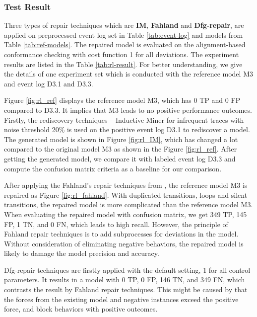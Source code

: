 \subsubsection{Test Result}
Three types of repair techniques which are \textbf{IM}, \textbf{Fahland} and \textbf{Dfg-repair}, are applied on preprocessed event log set in Table \ref{tab:event-log} and models from Table \ref{tab:ref-models}. The repaired model is evaluated on the alignment-based conformance checking with cost function 1 for all deviations. The experiment results are listed in the Table \ref{tab:rl-result}. For better understanding, we give the details of one experiment set which is conducted with the reference model M3 and event log D3.1 and D3.3.  

Figure \ref{fig:rl_ref} displays the reference model M3, which has 0 TP and 0 FP compared to D3.3. It implies that M3 leads to no positive performance outcomes. Firstly, the rediscovery techniques -- Inductive Miner for infrequent traces with noise threshold 20\% is used on the positive event log D3.1 to rediscover a model. The generated model is shown in Figure \ref{fig:rl_IM}, which has changed a lot compared to the original model M3 as shown in the Figure \ref{fig:rl_ref}. After getting the generated model, we compare it with labeled event log D3.3 and compute the confusion matrix criteria as a baseline for our comparison. 

After applying the Fahland's repair techniques from \cite{fahland2015model}, the reference model M3 is repaired as Figure \ref{fig:rl_fahland}. With duplicated transitions, loops and silent transitions, the repaired model is more complicated than the reference model M3. When evaluating the repaired model with confusion matrix, we get 349 TP, 145 FP, 1 TN, and 0 FN, which leads to high recall. However, the principle of Fahland repair techniques is to add subprocesses for deviations in the model. Without consideration of eliminating negative behaviors, the repaired model is likely to damage the model precision and accuracy.

Dfg-repair techniques are firstly applied with the default setting, 1 for all control parameters. It results in a model with 0 TP, 0 FP, 146 TN, and 349 FN,  which contrasts the result by Fahland repair techniques. This might be caused by that the forces from the existing model and negative instances exceed the positive force, and block behaviors with positive outcomes. 

